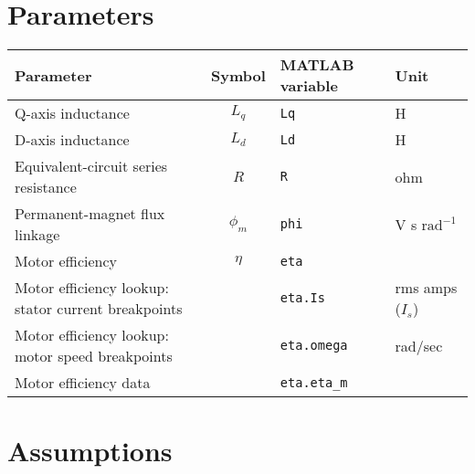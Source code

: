 \documentclass[../SimBALink.tex]{subfiles}
\begin{document}
\section{Parameters}
	
	\renewcommand{\arraystretch}{1.5}
	\begin{tabular}{ p{5cm} | c | l | l }
		Parameter					&	Symbol				&	MATLAB variable	&	Unit						\\\hline	
		Q-axis inductance				&	$L_q$				&	\texttt{Lq}			&	H			\\
		D-axis inductance				&	$L_d$				&	\texttt{Ld}			&	H			\\
		Equivalent-circuit series resistance	&	$R$					&	\texttt{R}			&	ohm			\\
		Permanent-magnet flux linkage	&	$\phi_m$				&	\texttt{phi}		&	V s $\text{rad}^{-1}$	\\
		Motor efficiency				&	$\eta$				&	\texttt{eta}		&				\\
		Motor efficiency lookup: stator current breakpoints	&			&	\texttt{eta.Is}		&	rms amps ($I_s$)	\\
		Motor efficiency lookup: motor speed breakpoints	&			&	\texttt{eta.omega}	& 	rad/sec		\\
		Motor efficiency data			&						&	\texttt{eta.eta\_m}	&	
	\end{tabular}


\section{Assumptions}



\end{document}
